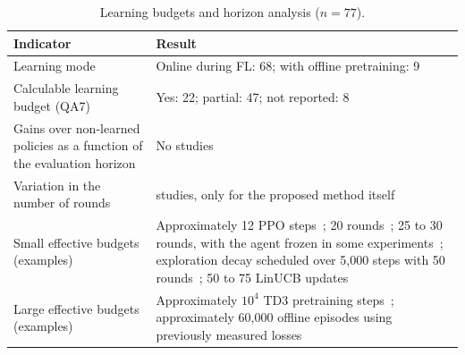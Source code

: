 \begin{table}[!ht]
  \centering
  \caption{Learning budgets and horizon analysis ($n = 77$).}
  \label{tab:orcamento}
  \footnotesize
  \setlength{\tabcolsep}{3pt}
  \renewcommand{\arraystretch}{1.12}
  \begin{tabularx}{\columnwidth}{@{}
    >{\raggedright\arraybackslash}p{3.1cm}
    >{\raggedright\arraybackslash}X
    @{}}
    \toprule
    Indicator & Result \\
    \midrule
    Learning mode
      & Online during FL: 68; with offline pretraining: 9~\cite{V2-4812,V2-3243,V2-1327,V2-0837,V2-0530,V2-0946,V2-1103,V2-0391,V2-4727} \\

    Calculable learning budget (QA7)
      & Yes: 22; partial: 47; not reported: 8 \\

    Gains over non-learned policies as a function of the evaluation horizon
      & No studies \\

    Variation in the number of rounds
      & 2 studies, only for the proposed method itself~\cite{V2-1483,SB-03} \\

    Small effective budgets (examples)
      & Approximately 12 PPO steps~\cite{V2-2573}; 20 rounds~\cite{V2-3494,V2-1025}; 25 to 30 rounds, with the agent frozen in some experiments~\cite{V2-2103}; exploration decay scheduled over 5,000 steps with 50 rounds~\cite{V2-4728}; 50 to 75 LinUCB updates~\cite{V2-4789} \\

    Large effective budgets (examples)
      & Approximately $10^4$ TD3 pretraining steps~\cite{V2-4812}; approximately 60,000 offline episodes using previously measured losses~\cite{V2-0530} \\
    \bottomrule
  \end{tabularx}
\end{table}
